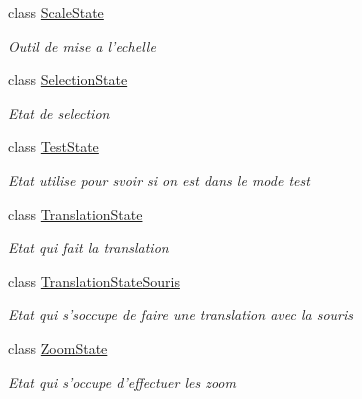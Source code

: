 \begin{DoxyCompactItemize}
class \hyperlink{class_interface_graphique_1_1patron__state_1_1_scale_state}{Scale\-State}
\begin{DoxyCompactList}\small\item\em Outil de mise a l'echelle \end{DoxyCompactList}\item 
class \hyperlink{class_interface_graphique_1_1patron__state_1_1_selection_state}{Selection\-State}
\begin{DoxyCompactList}\small\item\em Etat de selection \end{DoxyCompactList}\item 
class \hyperlink{class_interface_graphique_1_1patron__state_1_1_test_state}{Test\-State}
\begin{DoxyCompactList}\small\item\em Etat utilise pour svoir si on est dans le mode test \end{DoxyCompactList}\item 
class \hyperlink{class_interface_graphique_1_1patron__state_1_1_translation_state}{Translation\-State}
\begin{DoxyCompactList}\small\item\em Etat qui fait la translation \end{DoxyCompactList}\item 
class \hyperlink{class_interface_graphique_1_1patron__state_1_1_translation_state_souris}{Translation\-State\-Souris}
\begin{DoxyCompactList}\small\item\em Etat qui s'soccupe de faire une translation avec la souris \end{DoxyCompactList}\item 
class \hyperlink{class_interface_graphique_1_1patron__state_1_1_zoom_state}{Zoom\-State}
\begin{DoxyCompactList}\small\item\em Etat qui s'occupe d'effectuer les zoom \end{DoxyCompactList}\end{DoxyCompactItemize}
